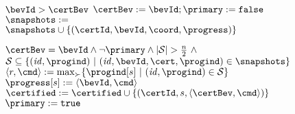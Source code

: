 \begin{figure}[t]
\begin{center}
\begin{algorithm}[H]
{\begin{distribalgo}[0]
\BLANK

\INDENT{\precond:}
  \STATE $\bevId > \certBev$
\ENDINDENT
\INDENT{\action:}
  \STATE $\certBev := \bevId; \primary := \texttt{false}$
  \STATE $\snapshots :=$\\
       \hspace{.08in} $ \snapshots \cup  \lbrace (\certId, \bevId, \coord, \progress) \rbrace$
\ENDINDENT
\ENDINDENT

\BLANK

\INDENT{\precond:}
  \STATE $\certBev = \bevId \land \lnot \primary \land |{\cal S}| > \frac{n}{2} ~\land$
  \STATE ${\cal S} \subseteq \lbrace (\mathit{id}, \progind) ~|~
	  (\mathit{id}, \bevId, \cert, \progind) \in \snapshots \rbrace$
\ENDINDENT
\INDENT{\action:}
  	\STATE $\langle r, \cmd \rangle := \max_{\succ} \lbrace \progind[s] ~|~ (\mathit{id}, \progind) \in {\cal S} \rbrace$
	\STATE $\progress[s] := \langle \bevId, \cmd \rangle$
	  \STATE $\certified := \certified \cup \lbrace (\certId, s, \langle \certBev, \cmd\rangle) \rbrace$
    \ENDINDENT
  \ENDINDENT
  \STATE $\primary := \texttt{true}$
\ENDINDENT
\ENDINDENT

\end{distribalgo}
}
\end{algorithm}
\end{center}
\end{figure}

\renewcommand{\thealgorithm}{\arabic{algorithm}}


